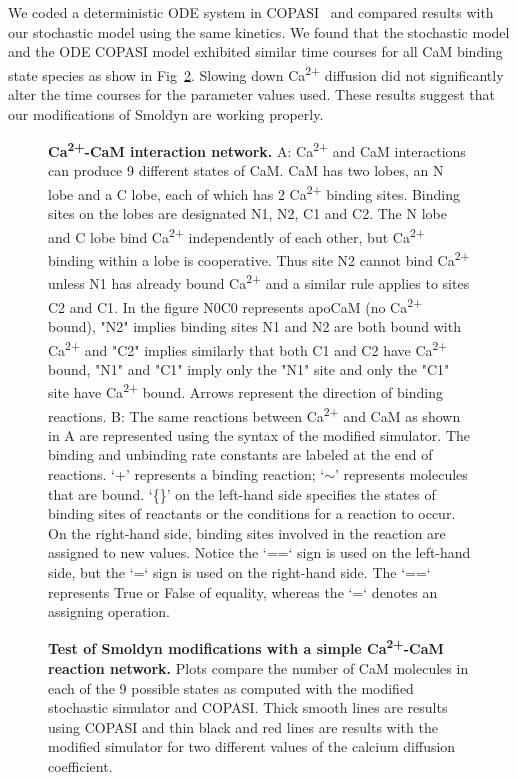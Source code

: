 \documentclass[10pt,letterpaper]{article}
\begin{document}
We coded a deterministic ODE system in COPASI~\cite{Hoops:2006gy} and compared results with our stochastic model using the same kinetics. We found that the stochastic model and the ODE COPASI model exhibited similar time courses for all CaM binding state species as show in Fig~\ref{fig2}. Slowing down Ca\textsuperscript{2+} diffusion did not significantly alter the time courses for the parameter values used. These results suggest that our modifications of Smoldyn are working properly. 

\begin{figure}[!h]
	\caption{{\bf Ca\textsuperscript{2+}-CaM interaction network.}
	A: Ca\textsuperscript{2+} and CaM interactions can produce 9 different states of CaM. CaM has two lobes, an N lobe and a C lobe, each of which has 2 Ca\textsuperscript{2+} binding sites. Binding sites on the lobes are designated N1, N2, C1 and C2. The N lobe and C lobe bind Ca\textsuperscript{2+} independently of each other, but Ca\textsuperscript{2+} binding within a lobe is cooperative. Thus site N2 cannot bind Ca\textsuperscript{2+} unless N1 has already bound Ca\textsuperscript{2+} and a similar rule applies to sites C2 and C1. In the figure N0C0 represents apoCaM (no Ca\textsuperscript{2+} bound), "N2" implies binding sites N1 and N2 are both bound with Ca\textsuperscript{2+} and "C2" implies similarly that both C1 and C2 have Ca\textsuperscript{2+} bound, "N1" and "C1" imply only the "N1" site and only the "C1" site have Ca\textsuperscript{2+} bound. Arrows represent the direction of binding reactions.
	B: The same reactions between Ca\textsuperscript{2+} and CaM as shown in A are represented using the syntax of the modified simulator. The binding and unbinding rate constants are labeled at the end of reactions. ‘+’ represents a binding reaction; ‘$\sim$’ represents molecules that are bound. ‘\{\}’ on the left-hand side specifies the states of binding sites of reactants or the conditions for a reaction to occur. On the right-hand side, binding sites involved in the reaction are assigned to new values. Notice the ‘==‘ sign is used on the left-hand side, but the ‘=‘ sign is used on the right-hand side. The ‘==‘ represents True or False of equality, whereas the ‘=‘ denotes an assigning operation. 
	}
\label{fig1}
\end{figure}
	 
\begin{figure}[!h]
	\caption{{\bf Test of Smoldyn modifications with a simple Ca\textsuperscript{2+}-CaM reaction network.}
	Plots compare the number of CaM molecules in each of the 9 possible states as computed with the modified stochastic simulator and COPASI. Thick smooth lines are results using COPASI and thin black and red lines are results with the modified simulator for two different values of the calcium diffusion coefficient.
	}
\label{fig2}
\end{figure}
\end{document}
